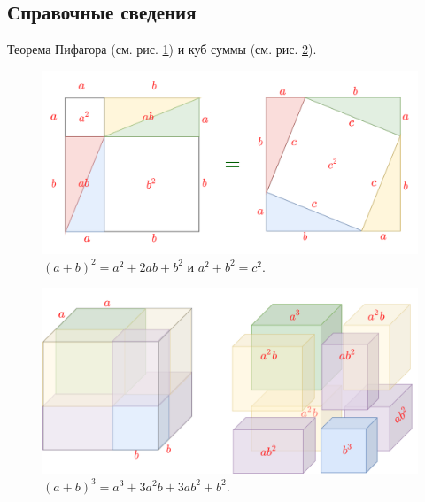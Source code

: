 \subsection*{Справочные сведения}

Теорема Пифагора (см. рис. \ref{pithagor}) и куб суммы (см. рис. \ref{kub}).

\begin{figure}[hbt!]
\begin{center}
\includegraphics[scale=0.25]{../pithagor.png}
\end{center}
\caption{$(a+b)^2=a^2+2ab+b^2$ и $a^2+b^2=c^2$.}\label{pithagor}
\end{figure}

\begin{figure}[hbt!]
\begin{center}
\includegraphics[scale=0.25]{../kub.png}
\end{center}
\caption{$(a+b)^3 = a^3+3a^2b+3ab^2+b^2$.}\label{kub}
\end{figure}



